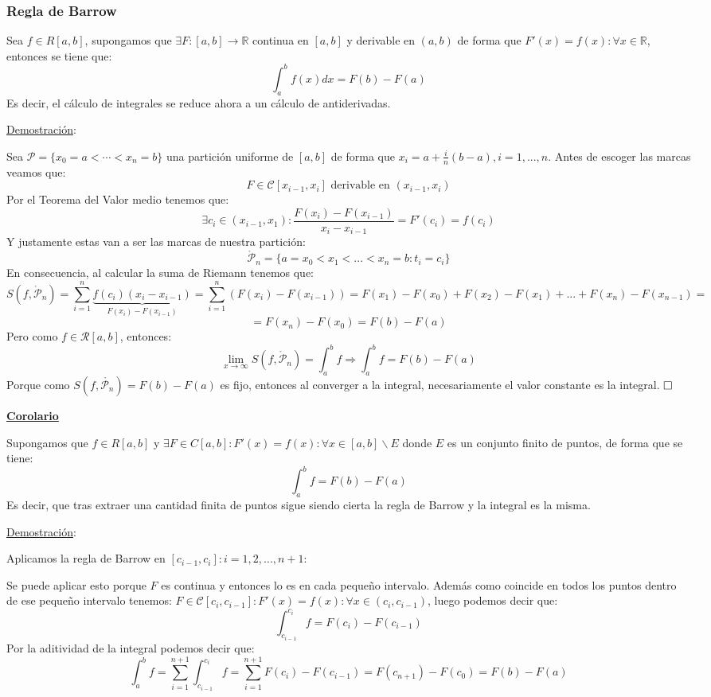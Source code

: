 \documentclass[10pt,a4paper,openright]{book}
\begin{document}
\subsubsection*{Regla de Barrow}
Sea $f\in R[a,b]$, supongamos que $\exists F: [a,b]\rightarrow\mathbb R$ continua en $[a,b]$ y derivable en $(a,b)$ de forma que $F'(x) = f(x): \forall x\in \mathbb R$, entonces se tiene que:
$$\int_{a}^{b} f(x)dx = F(b)-F(a)$$
Es decir, el cálculo de integrales se reduce ahora a un cálculo de antiderivadas.

\underline{Demostración}:

Sea $\mathcal{P} = \{x_0 = a < \cdots < x_n = b\}$ una partición uniforme de $[a,b]$ de forma que $x_i = a + \frac{i}{n} (b-a), i=1,...,n$. Antes de escoger las marcas veamos que:
$$F \in \mathcal{C}[x_{i-1},x_i]\mbox{ derivable en }(x_{i-1},x_i)$$
Por el Teorema del Valor medio tenemos que:
$$\exists c_i \in (x_{i-1},x_1): \frac{F(x_i)-F(x_{i-1})}{x_i - x_{i-1}} = F'(c_i)= f(c_i)$$
Y justamente estas van a ser las marcas de nuestra partición:
$$\mathring{\mathcal{P}}_n = \{a=x_0 < x_1 <...<x_n = b:  t_i = c_i\}$$
En consecuencia, al calcular la suma de Riemann tenemos que:
$$S(f, \mathring{\mathcal{P}}_n)= \sum^n_{i=1} \underbrace{f(c_i)(x_i - x_{i-1})}_{F(x_i)-F(x_{i-1})} = \sum^n_{i=1} \left( F(x_i)-F(x_{i-1}) \right) = F(x_1)- F(x_0) + F(x_2) - F(x_1) + ... + F(x_n)-F(x_{n-1}) =$$
$$= F(x_n) - F(x_0) = F(b) - F(a)$$
Pero como $f \in \mathcal{R}[a,b]$, entonces:
$$\lim_{x \to \infty}S(f, \mathring{\mathcal{P}}_n) = \int^b_a f\Rightarrow \int^b_a f = F(b) - F(a)$$
Porque como $S(f,\mathring{\mathcal{P}_n}) = F(b)-F(a)$ es fijo, entonces al converger a la integral, necesariamente el valor constante es la integral.
$\hfill\square$

\underline{\textbf{Corolario}}

Supongamos que $f\in R[a,b]$ y $\exists F\in C[a,b]: F'(x) = f(x):\forall x\in [a,b]\backslash E$ donde $E$ es un conjunto finito de puntos, de forma que se tiene:
$$\int_{a}^{b}f= F(b)- F(a)$$
Es decir, que tras extraer una cantidad finita de puntos sigue siendo cierta la regla de Barrow y la integral es la misma.

\underline{Demostración}:

Aplicamos la regla de Barrow en $[c_{i-1},c_{i}]: i = 1,2,..., n+1$:


Se puede aplicar esto porque $F$ es continua  y entonces lo es en cada pequeño intervalo. Además como coincide en todos los puntos dentro de ese pequeño intervalo tenemos: $F \in \mathcal{C}[c_i , c_{i-1}]:  F'(x)=f(x): \forall x \in (c_i , c_{i-1})$, luego podemos decir que:
$$\int_{c_{i-1}}^{c_i} f = F(c_i) - F(c_{i-1})$$
Por la aditividad de la integral podemos decir que:
$$\int_{a}^{b} f = \sum_{i=1}^{n+1} \int_{c_{i-1}}^{c_i} f = \sum_{i=1}^{n+1} F(c_i) - F(c_{i-1})= F(c_{n+1}) - F(c_0)  = F(b) - F(a)$$
\end{document}

